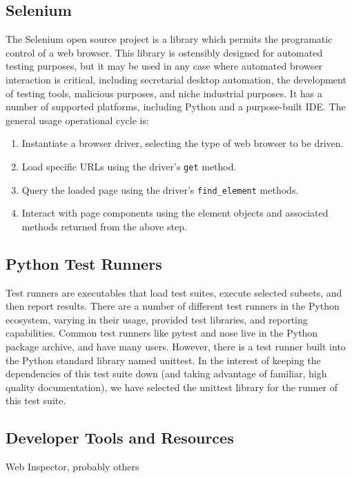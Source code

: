 \subsection{Selenium}
The Selenium open source project is a library which permits the programatic control of a web browser. This library is ostensibly designed for automated testing purposes, but it may be used in any case where automated browser interaction is critical, including secretarial desktop automation, the development of testing tools, malicious purposes, and niche industrial purposes. It has a number of supported platforms, including Python and a purpose-built IDE. The general usage operational cycle is:
\begin{enumerate}
\item Instantiate a browser driver, selecting the type of web browser to be driven.
\item Load specific URLs using the driver's \texttt{get} method.
\item Query the loaded page using the driver's \texttt{find\_element} methods.
\item Interact with page components using the element objects and associated methods returned from the above step.
\end{enumerate}\citep{holmes2006automating, bruns2009web, razak2011agile, wang2009build, kaur2013comparative, kongsli2007security, artzi2011framework}

\subsection{Python Test Runners}
Test runners are executables that load test suites, execute selected subsets, and then report results. There are a number of different test runners in the Python ecosystem, varying in their usage, provided test libraries, and reporting capabilities. Common test runners like pytest and nose live in the Python package archive, and have many users. However, there is a test runner built into the Python standard library named unittest. In the interest of keeping the dependencies of this test suite down (and taking advantage of familiar, high quality documentation), we have selected the unittest library for the runner of this test suite. \citep{nielsen2014python, pajankar2017python}

\subsection{Developer Tools and Resources}
Web Inspector, probably others\citep{odell2014browser}

